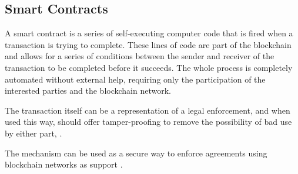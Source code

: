 \subsection{Smart Contracts}

A smart contract is a series of self-executing computer code that is fired when a transaction is trying to complete. These lines of code are part of the blockchain and allows for a series of conditions between the sender and receiver of the transaction to be completed before it succeeds. The whole process is completely automated without external help, requiring only the participation of the interested parties and the blockchain network.

The transaction itself can be a representation of a legal enforcement, and when used this way, should offer tamper-proofing to remove the possibility of bad use by either part, \cite{templates}.

The mechanism can be used as a secure way to enforce agreements using blockchain networks as support \cite{securing}.



